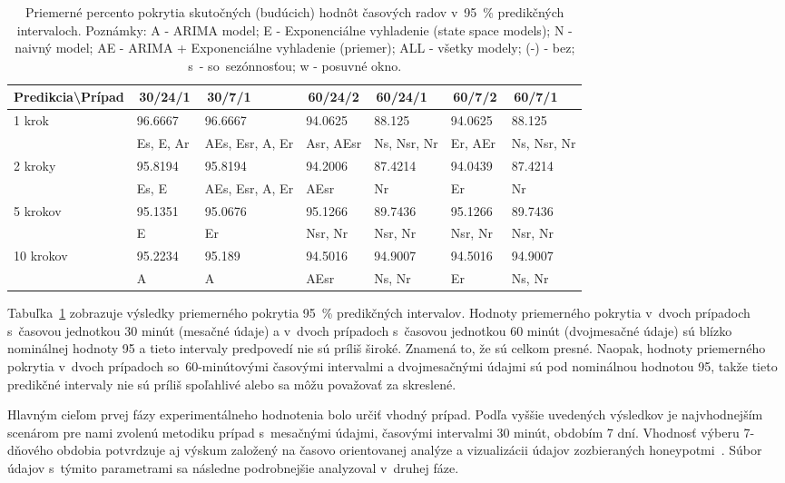\documentclass[thesismargins, thesislinespacing, openright, upjsfrontpage]{rnthesis}
\begin{document}
\begin{table}[h]
    \centering
    \footnotesize 
    \begin{tabular}{|p{3cm}|p{1.5cm}|p{1.5cm}|p{1.5cm}|p{1.5cm}|p{1.5cm}|p{1.5cm}|} \hline
        Predikcia\textbackslash Prípad & \,30/24/1\, & \,30/7/1\, & \,60/24/2\, & \,60/24/1\, & \,60/7/2\, & \,60/7/1\, \\
     \hline\hline
        \multirow{2}{*}{1 krok} & 96.6667 & 96.6667 & 94.0625 & 88.125 & 94.0625 & 88.125 \\
        & Es, E, Ar & AEs, Esr, A, Er & Asr, AEsr & Ns, Nsr, Nr & Er, AEr & Ns, Nsr, Nr  \\
        \hline
        \multirow{2}{*}{2 kroky} & 95.8194 & 95.8194 & 94.2006 & 87.4214 & 94.0439 & 87.4214 \\
        & Es, E & AEs, Esr, A, Er & AEsr & Nr & Er & Nr \\
        \hline
        \multirow{2}{*}{5 krokov} & 95.1351 & 95.0676 & 95.1266 & 89.7436 & 95.1266 & 89.7436 \\
        & E & Er & Nsr, Nr & Nsr, Nr & Nsr, Nr & Nsr, Nr  \\
        \hline
        \multirow{2}{*}{10 krokov} & 95.2234 & 95.189 & 94.5016 & 94.9007 & 94.5016 & 94.9007 \\
        & A & A & AEsr & Ns, Nr & Er & Ns, Nr \\
        \hline
    \end{tabular}
    \caption{Priemerné percento pokrytia skutočných (budúcich) hodnôt časových radov v~95~\% predikčných intervaloch. Poznámky: A - ARIMA model; E - Exponenciálne vyhladenie (state space models); N - naivný model; AE - ARIMA + Exponenciálne vyhladenie (priemer); ALL - všetky modely; (-) - bez; s~- so~sezónnosťou; w - posuvné okno.}
    \label{tab:avg_95}
\end{table}

Tabuľka~\ref{tab:avg_95} zobrazuje výsledky priemerného pokrytia 95~\% predikčných intervalov. Hodnoty priemerného pokrytia v~dvoch prípadoch s~časovou jednotkou 30 minút (mesačné údaje) a v~dvoch prípadoch s~časovou jednotkou 60 minút (dvojmesačné údaje) sú blízko nominálnej hodnoty 95 a tieto intervaly predpovedí nie sú príliš široké. Znamená to, že sú celkom presné. Naopak, hodnoty priemerného pokrytia v~dvoch prípadoch so~60-minútovými časovými intervalmi a dvojmesačnými údajmi sú pod nominálnou hodnotou 95, takže tieto predikčné intervaly nie sú príliš spoľahlivé alebo sa môžu považovať za skreslené.

Hlavným cieľom prvej fázy experimentálneho hodnotenia bolo určiť vhodný prípad. Podľa vyššie uvedených výsledkov je najvhodnejším scenárom pre nami zvolenú metodiku prípad s~mesačnými údajmi, časovými intervalmi 30 minút, obdobím 7 dní. Vhodnosť výberu 7-dňového obdobia potvrdzuje aj výskum založený na časovo orientovanej analýze a vizualizácii údajov zozbieraných honeypotmi~\cite{sokol2015study}. Súbor údajov s~týmito parametrami sa následne podrobnejšie analyzoval v~druhej fáze.
\end{document}
